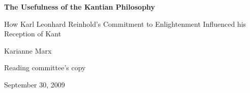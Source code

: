 \textbf{The Usefulness of the Kantian Philosophy}

How Karl Leonhard Reinhold's Commitment to Enlightenment Influenced his Reception of Kant

Karianne Marx

Reading committee's copy

September 30, 2009

